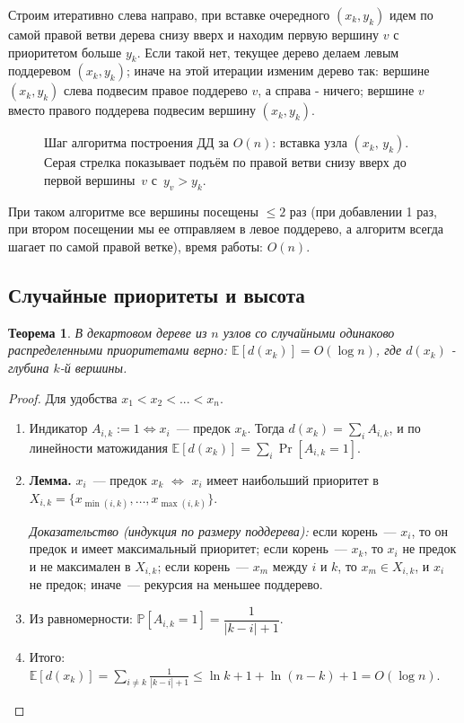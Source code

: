 \documentclass[12pt, a4paper]{article}
\theoremstyle{definition}
\theoremstyle{plain}
\newtheorem*{theorem}{Теорема}
\theoremstyle{remark}
\begin{document}
Строим итеративно слева направо, при вставке очередного $(x_k, y_k)$ идем по самой правой ветви дерева снизу вверх и находим первую вершину $v$ с приоритетом больше $y_{k}$. Если такой нет, текущее дерево делаем левым поддеревом $(x_k, y_k)$; иначе на этой итерации изменим дерево так: вершине $(x_k, y_k)$ слева подвесим правое поддерево $v$, а справа - ничего; вершине $v$ вместо правого поддерева подвесим вершину $(x_k, y_k)$. 

\begin{figure}[h]
\centering

\caption{
  Шаг алгоритма построения ДД за $O(n)$: вставка узла $(x_k,\,y_k)$.
  Серая стрелка показывает подъём по правой ветви снизу вверх
  до первой вершины~$v$ с~$y_v>y_k$.}
\end{figure}

При таком алгоритме все вершины посещены $\leq 2$ раз (при добавлении 1 раз, при втором посещении мы ее отправляем в левое поддерево, а алгоритм всегда шагает по самой правой ветке), время работы: $O(n)$.

\subsection{Случайные приоритеты и высота}

\begin{theorem}
В декартовом дереве из $n$ узлов со случайными одинаково распределенными приоритетами верно: $\mathbb{E}[d(x_k)] = O(\log n)$, где $d(x_k)$ - глубина $k$-й вершины.
\end{theorem}

\begin{proof}
Для удобства $x_1 < x_2 < ... < x_n$. 
\begin{enumerate}
  \item Индикатор $A_{i,k} := 1 \Leftrightarrow x_i$~--- предок $x_k$.
        Тогда $d(x_k) = \sum_i A_{i,k}$, и по линейности матожидания
        $\mathbb{E}[d(x_k)] = \sum_i \Pr[A_{i,k} = 1]$.

  \item \textbf{Лемма.} $x_i$~--- предок $x_k$ $\Leftrightarrow$ $x_i$ имеет
        наибольший приоритет в $X_{i,k} = \{x_{\min(i,k)},\ldots,x_{\max(i,k)}\}$.

        \textit{Доказательство (индукция по размеру поддерева):}
        если корень~--- $x_i$, то он предок и имеет максимальный приоритет;
        если корень~--- $x_k$, то $x_i$ не предок и не максимален в $X_{i,k}$;
        если корень~--- $x_m$ между $i$ и $k$, то $x_m\in X_{i,k}$, и $x_i$
        не предок; иначе~--- рекурсия на меньшее поддерево.

  \item Из равномерности: $\mathbb{P}[A_{i,k}=1] = \dfrac{1}{|k-i|+1}$.

  \item Итого:
        $\mathbb{E}[d(x_k)] = \displaystyle\sum_{i\neq k}\frac{1}{|k-i|+1}
        \leq \ln k + 1 + \ln(n-k) + 1 = O(\log n)$.\qedhere
\end{enumerate}
\end{proof}
\end{document}
